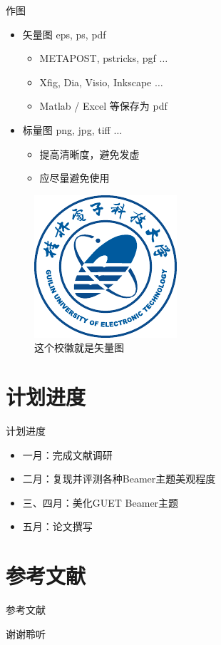 \documentclass[aspectratio=169,AutoFakeBold]{beamer}
\begin{document}
\begin{frame}{作图}
    \begin{itemize}
        \item 矢量图 eps, ps, pdf
              \begin{itemize}
                  \item METAPOST, pstricks, pgf $\ldots$
                  \item Xfig, Dia, Visio, Inkscape $\ldots$
                  \item Matlab / Excel 等保存为 pdf
              \end{itemize}
        \item 标量图 png, jpg, tiff $\ldots$
              \begin{itemize}
                  \item 提高清晰度，避免发虚
                  \item 应尽量避免使用
              \end{itemize}
    \end{itemize}
    \begin{figure}[htpb]
        \centering
        \includegraphics[width=0.2\linewidth]{Guet-logo.pdf}
        \caption{这个校徽就是矢量图}
    \end{figure}
\end{frame}


\section{计划进度}
\begin{frame}{计划进度}
    \begin{itemize}
        \item 一月：完成文献调研\cite{张营营2018生成对抗网络模型综述}
        \item 二月：复现并评测各种Beamer主题美观程度
        \item 三、四月：美化GUET Beamer主题\cite{creswell2018generative}
        \item 五月：论文撰写
    \end{itemize}
\end{frame}


\section{参考文献}

\begin{frame}[allowframebreaks]{参考文献}
    
\end{frame}

\begin{frame}
    \Background
    \begin{center}
        {\Huge\calligra 谢谢聆听}
    \end{center}
\end{frame}
\end{document}
